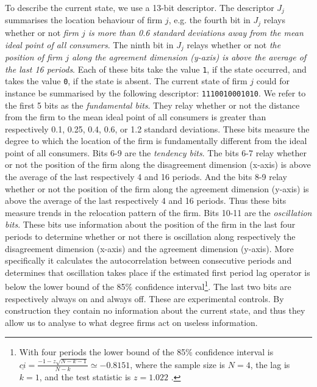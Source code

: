 \documentclass[preprint, 12pt]{elsarticle}
\begin{document}
To describe the current state, we use a 13-bit descriptor. The descriptor $J_j$ summarises the location behaviour of firm $j$, e.g. the fourth bit in $J_j$ relays whether or not \emph{firm $j$ is more than 0.6 standard deviations away from the mean ideal point of all consumers}. The ninth bit in $J_j$ relays whether or not \emph{the position of firm $j$ along the agreement dimension (y-axis) is above the average of the last 16 periods}. Each of these bits take the value \texttt{1}, if the state occurred, and takes the value \texttt{0}, if the state is absent. The current state of firm $j$ could for instance be summarised by the following descriptor: \texttt{1110010001010}. We refer to the first 5 bits as the \emph{fundamental bits}. They relay whether or not the distance from the firm to the mean ideal point of all consumers is greater than respectively 0.1, 0.25, 0.4, 0.6, or 1.2 standard deviations. These bits measure the degree to which the location of the firm is fundamentally different from the ideal point of all consumers. Bits 6-9 are the \emph{tendency bits}. The bits 6-7 relay whether or not the position of the firm along the disagreement dimension (x-axis) is above the average of the last respectively 4 and 16 periods. And the bits 8-9 relay whether or not the position of the firm along the agreement dimension (y-axis) is above the average of the last respectively 4 and 16 periods. Thus these bits measure trends in the relocation pattern of the firm. Bits 10-11 are the \emph{oscillation bits}. These bits use information about the position of the firm in the last four periods to determine whether or not there is oscillation along respectively the disagreement dimension (x-axis) and the agreement dimension (y-axis). More specifically it calculates the autocorrelation between consecutive periods and determines that oscillation takes place if the estimated first period lag operator is below the lower bound of the 85\% confidence interval\footnote{With four periods the lower bound of the 85\% confidence interval is $\underline{ci} = \frac{-1 - z \sqrt{N-k-1}}{N-k} \simeq -0.8151$, where the sample size is $N = 4$, the lag is $k=1$, and the test statistic is $z = 1.022$ \citep{Meko_2015, Chatfield_2016}.}. The last two bits are respectively always on and always off. These are experimental controls. By construction they contain no information about the current state, and thus they allow us to analyse to what degree firms act on useless information. 
\end{document}
